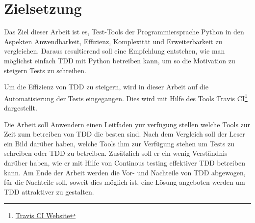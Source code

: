 \section{Zielsetzung}
Das Ziel dieser Arbeit ist es, Test-Tools der Programmiersprache Python in den
Aspekten Anwendbarkeit, Effizienz, Komplexität und Erweiterbarkeit zu
vergleichen. Daraus resultierend soll eine Empfehlung entstehen, wie man
möglichst einfach TDD mit Python betreiben kann, um so die Motivation zu steigern
Tests zu schreiben.

Um die Effizienz von TDD zu steigern, wird in dieser Arbeit auf die Automatisierung
der Tests eingegangen. Dies wird mit Hilfe des Tools
Travis CI\footnote{\href{https://travis-ci.org/}{Travis CI Website}}
dargestellt.

Die Arbeit soll Anwendern einen Leitfaden yur verfügung stellen welche Tools
zur Zeit zum betreiben von TDD die besten sind.
Nach dem Vergleich soll der Leser ein Bild darüber haben, welche Tools ihm zur
Verfügung stehen um Tests zu schreiben oder TDD zu betreiben. Zusätzlich soll
er ein wenig Verständnis darüber haben, wie er mit Hilfe von
\gls{Continous testing} effektiver TDD betreiben kann.
\newline
Am Ende der Arbeit werden die Vor- und Nachteile von TDD abgewogen, für die
Nachteile soll, soweit dies möglich ist, eine Lösung angeboten werden um TDD
attraktiver zu gestalten.
